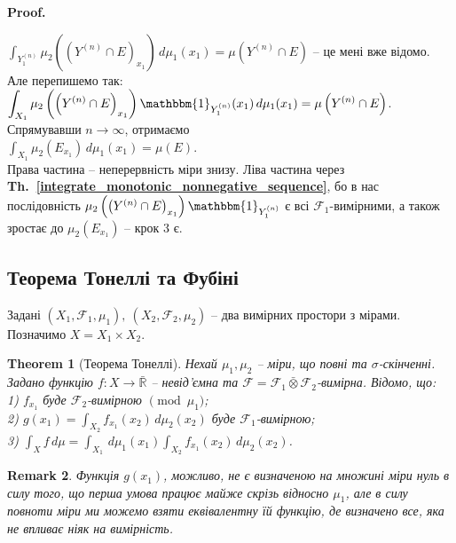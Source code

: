 \documentclass[a4paper, 10pt]{article}
\makeatletter
\theoremstyle{theoremdd}
\newtheorem{theorem}{Theorem}[subsection]
\newtheorem{remark}[theorem]{Remark}
\newcommand\thref[1]{\textbf{Th.~\ref{#1}}}
\renewenvironment{proof}[1][Proof.\\]{\par
\pushQED{\hfill \qed}%
\normalfont \topsep6\p@\@plus6\p@\relax
\trivlist
\item\relax
{\bfseries
#1\@addpunct{.}}\hspace\labelsep\ignorespaces
}{%
\popQED\endtrivlist\@endpefalse
}
\makeatother
\begin{document}
\begin{proof}
$\displaystyle\int_{Y_1^{(n)}} \mu_2\left( \left(Y^{(n)} \cap E\right)_{x_1} \right)\,d\mu_1(x_1) = \mu\left( Y^{(n)} \cap E \right)$ -- це мені вже відомо. Але перепишемо так:\\
$\displaystyle\int_{X_1}  \mu_2\left( \left(Y^{(n)} \cap E\right)_{x_1} \right) \mathbbm{1}_{Y_1^{(n)}}(x_1)\,d\mu_1(x_1) = \mu\left( Y^{(n)} \cap E \right)$. Спрямувавши $n \to \infty$, отримаємо\\
$\displaystyle\int_{X_1} \mu_2(E_{x_1})\,d\mu_1(x_1) = \mu(E)$.\\
Права частина -- неперервність міри знизу. Ліва частина через \thref{integrate_monotonic_nonnegative_sequence}, бо в нас послідовність $\mu_2\left( \left(Y^{(n)} \cap E\right)_{x_1} \right) \mathbbm{1}_{Y_1^{(n)}}$ є всі $\mathcal{F}_1$-вимірними, а також зростає до $\mu_2(E_{x_1})$ -- крок 3 є.
\end{proof}

\subsection{Теорема Тонеллі та Фубіні}
Задані $(X_1,\mathcal{F}_1, \mu_1),\ (X_2,\mathcal{F}_2,\mu_2)$ -- два вимірних простори з мірами. Позначимо $X = X_1 \times X_2$.

\begin{theorem}[Теорема Тонеллі]
Нехай $\mu_1,\mu_2$ -- міри, що повні та $\sigma$-скінченні. Задано функцію $f \colon X \to \bar{\mathbb{R}}$ -- невід'ємна та $\mathcal{F} = \mathcal{F}_1 \bar{\otimes} \mathcal{F}_2$-вимірна. Відомо, що:\\
1) $f_{x_1}$ буде $\mathcal{F}_2$-вимірною $\pmod {\mu_1}$;\\
2) $g(x_1) = \displaystyle\int_{X_2} f_{x_1}(x_2)\,d\mu_2(x_2)$ буде $\mathcal{F}_1$-вимірною;\\
3) $\displaystyle\int_X f\,d\mu = \int_{X_1} \,d\mu_1(x_1) \int_{X_2} f_{x_1}(x_2)\,d\mu_2(x_2)$.
\end{theorem}

\begin{remark}
Функція $g(x_1)$, можливо, не є визначеною на множині міри нуль в силу того, що перша умова працює майже скрізь відносно $\mu_1$, але в силу повноти міри ми можемо взяти еквівалентну їй функцію, де визначено все, яка не впливає ніяк на вимірність.
\end{remark}
\end{document}
